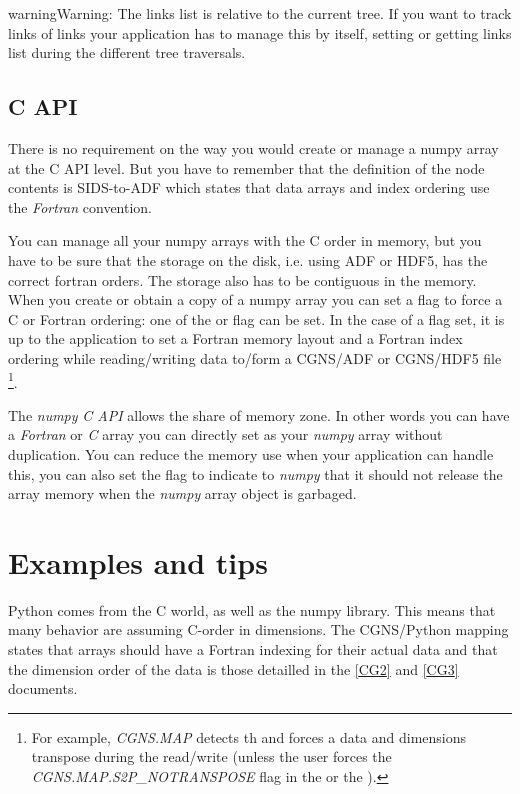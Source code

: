 \documentclass[a4paper,10pt,english]{sphinxmanual}
\begin{document}
\begin{notice}{warning}{Warning:}
The links list is relative to the current tree. If you want to track
links of links your application has to manage this by itself, setting or
getting links list during the different tree traversals.
\end{notice}


\section{C API}
\label{sids-to-python:c-api}
There is no requirement on the way you would create or manage a numpy array
at the C API level. But you have to remember that the definition of the
node contents is SIDS-to-ADF which states that data arrays and index ordering
use the \emph{Fortran} convention.

You can manage all your numpy arrays with the C order in memory, but you have
to be sure that the storage on the disk, i.e. using ADF or HDF5, has the
correct fortran orders. The storage also has to be contiguous in the memory.
When you create or obtain a copy of a numpy array you can set a flag to
force a C or Fortran ordering:
one of the  or  flag can be set.
In the case of a  flag set, it is up to the application to
set a Fortran memory layout and a Fortran index ordering while reading/writing
data to/form a CGNS/ADF or CGNS/HDF5 file \footnote{
For example, \emph{CGNS.MAP} detects th  and forces
a data and dimensions transpose during the read/write (unless the
user forces the \emph{CGNS.MAP.S2P\_NOTRANSPOSE} flag in the  or
the ).
}.

The \emph{numpy} \emph{C API} allows the share of memory zone. In other words you can
have a \emph{Fortran} or \emph{C} array you can directly set as your \emph{numpy} array
without duplication. You can reduce the memory use when your application
can handle this, you can also set the  flag to indicate to
\emph{numpy} that it should not release the array memory when the \emph{numpy}
array object is garbaged.


\chapter{Examples and tips}
\label{sids-to-python:examples-and-tips}
Python comes from the C world, as well as the numpy library. This means
that many behavior are assuming C-order in dimensions. The
CGNS/Python mapping states that arrays should have a Fortran indexing
for their actual data and that the dimension
order of the data is those detailled in the {\hyperref[sids-to-python:cg2]{{[}CG2{]}}} and {\hyperref[sids-to-python:cg3]{{[}CG3{]}}}
documents.
\end{document}
